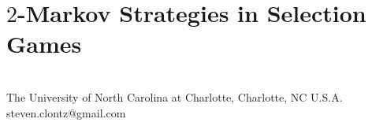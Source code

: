 \documentclass{amsart}
\begin{document}
\newcommand{\win}{\uparrow}
\newcommand{\prewin}{\underset{\text{pre}}{\uparrow}}
\newcommand{\markwin}{\underset{\text{mark}}{\uparrow}}
\newcommand{\tactwin}{\underset{\text{tact}}{\uparrow}}
\newcommand{\kmarkwin}[1]{\underset{#1\text{-mark}}{\uparrow}}
\newcommand{\ktactwin}[1]{\underset{#1\text{-tact}}{\uparrow}}
\newcommand{\codewin}{\underset{\text{code}}{\uparrow}}
\newcommand{\flexmarkwin}{\underset{\text{flexmark}}{\uparrow}}
\newcommand{\semiflexmarkwin}{\underset{\text{semiflexmark}}{\uparrow}}
\newcommand{\limitwin}{\underset{\text{limit}}{\uparrow}}
\newcommand{\notwin}{\not\uparrow}
\newcommand{\notprewin}{\underset{\text{pre}}{\not\uparrow}}
\newcommand{\notmarkwin}{\underset{\text{mark}}{\not\uparrow}}
\newcommand{\nottactwin}{\underset{\text{tact}}{\not\uparrow}}
\newcommand{\notkmarkwin}[1]{\underset{#1\text{-mark}}{\not\uparrow}}
\newcommand{\notktactwin}[1]{\underset{#1\text{-tact}}{\not\uparrow}}
\newcommand{\notcodewin}{\underset{\text{code}}{\not\uparrow}}
\newcommand{\notflexmarkwin}{\underset{\text{flexmark}}{\not\uparrow}}
\newcommand{\notsemiflexmarkwin}{\underset{\text{semiflexmark}}{\uparrow}}
\newcommand{\notlimitwin}{\underset{\text{limit}}{\not\uparrow}}

\newcommand{\onePtComp}[1]{#1^\star}
\newcommand{\onePtLind}[1]{#1^\dagger}


\newcommand{\sPrinciple}[2]{S^\omega_{fin}(#1,#2)}
\newcommand{\sGame}[2]{G^\omega_{fin}(#1,#2)}






\newcommand{\mc}[1]{\mathcal{#1}}
\newcommand{\mb}[1]{\mathbb{#1}}
\newcommand{\mf}[1]{\mathfrak{#1}}



\newcommand{\dom}{\operatorname{dom}}


\newcommand{\alcompS}[1]{\mc A(#1)}
\newcommand{\alcompSP}[1]{\mc A'(#1)}
\newcommand{\splendidS}[1]{\mc S(#1)}
\newcommand{\kurepaS}[1]{\mc K(#1)}



\newcommand{\pl}[1]{\mathscr{#1}}



\newcommand{\term}{\textit}



\section{\(2\)-Markov Strategies in Selection Games}
\\
The University of North Carolina at Charlotte, Charlotte, NC U.S.A.
\\
steven.clontz@gmail.com
\\
\\
\end{document}
